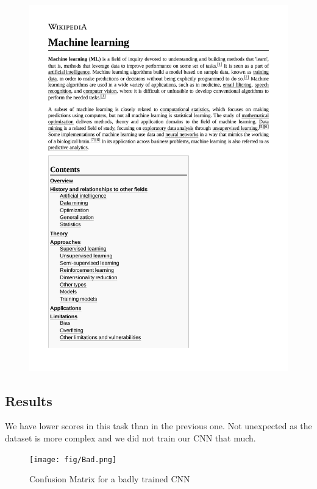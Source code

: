 \documentclass[12pt,a4paper]{article}
\begin{document}
\begin{figure}[h]
	\includegraphics[scale=0.6]{courses/Machine_learning.pdf}
\end{figure}
\subsection{Results}

We have lower scores in this task than in the previous one. Not unexpected as the dataset is more complex and we did not train our CNN that much.

\begin{figure}[h]
\centering
\texttt{[image: fig/Bad.png]}
\caption{Confusion Matrix for a badly trained CNN}
\end{figure}
\end{document}
